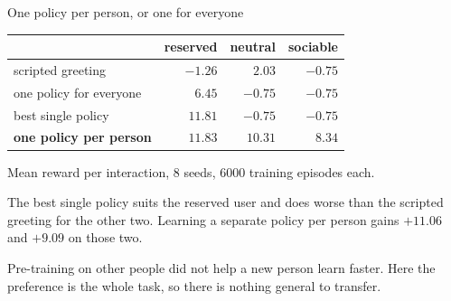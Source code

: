 \documentclass[aspectratio=169,10pt]{beamer}
\begin{document}
\begin{frame}{One policy per person, or one for everyone}
\centering
\begin{tabular}{lrrr}
\toprule
 & reserved & neutral & sociable \\
\midrule
scripted greeting       & $-1.26$ & $2.03$ & $-0.75$ \\
one policy for everyone & $6.45$  & $-0.75$ & $-0.75$ \\
best single policy      & $11.81$ & $-0.75$ & $-0.75$ \\
\textbf{one policy per person} & $\mathbf{11.83}$ & $\mathbf{10.31}$ & $\mathbf{8.34}$ \\
\bottomrule
\end{tabular}

\medskip
{\small Mean reward per interaction, 8 seeds, 6000 training episodes each.}

\bigskip
\raggedright
The best single policy suits the reserved user and does worse than the scripted
greeting for the other two. Learning a separate policy per person gains $+11.06$
and $+9.09$ on those two.

\medskip
Pre-training on other people did not help a new person learn faster. Here the
preference is the whole task, so there is nothing general to transfer.
\end{frame}
\end{document}
